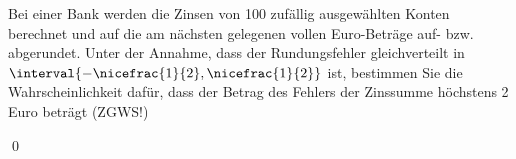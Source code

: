 \documentclass{abgabe}
\begin{document}
\begin{questions}
    \question
    Bei einer Bank werden die Zinsen von 100 zufällig ausgewählten Konten berechnet und auf die am nächsten gelegenen vollen Euro-Beträge auf- bzw. abgerundet. 
    Unter der Annahme, dass der Rundungsfehler gleichverteilt in $\interval{-\nicefrac{1}{2}, \nicefrac{1}{2}}$ ist, bestimmen Sie die Wahrscheinlichkeit dafür, dass der Betrag des Fehlers der Zinssumme höchstens 2 Euro beträgt (ZGWS!)       
    \begin{solution}

        \qed
    \end{solution}
\end{questions}
\end{document}
